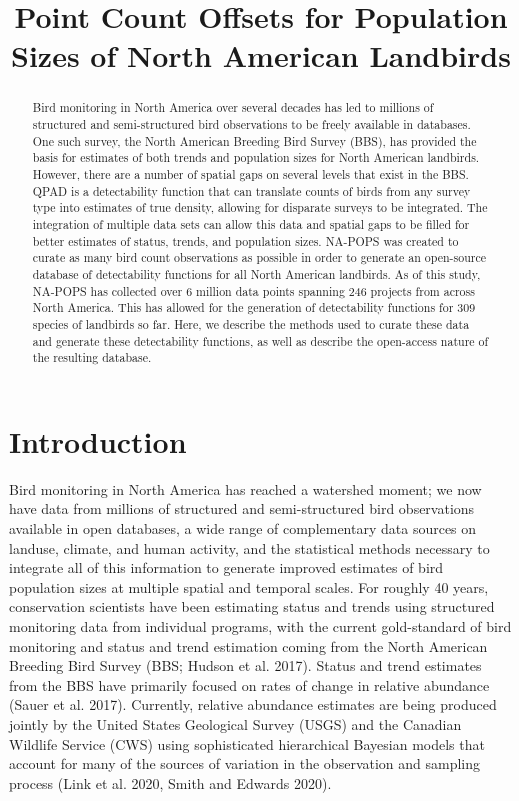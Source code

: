 \documentclass[]{article}
\title{Point Count Offsets for Population Sizes of North American Landbirds}
\author{}
\begin{document}
\maketitle

\begin{abstract}
Bird monitoring in North America over several decades has led to millions of structured and semi-structured bird observations to be freely available in databases. One such survey, the North American Breeding Bird Survey (BBS), has provided the basis for estimates of both trends and population sizes for North American landbirds. However, there are a number of spatial gaps on several levels that exist in the BBS. QPAD is a detectability function that can translate counts of birds from any survey type into estimates of true density, allowing for disparate surveys to be integrated. The integration of multiple data sets can allow this data and spatial gaps to be filled for better estimates of status, trends, and population sizes. NA-POPS was created to curate as many bird count observations as possible in order to generate an open-source database of detectability functions for all North American landbirds. As of this study, NA-POPS has collected over 6 million data points spanning 246 projects from across North America. This has allowed for the generation of detectability functions for 309 species of landbirds so far. Here, we describe the methods used to curate these data and generate these detectability functions, as well as describe the open-access nature of the resulting database.
\end{abstract}

\section{Introduction}
Bird monitoring in North America has reached a watershed moment; we now have data from millions of structured and semi-structured bird observations available in open databases, a wide range of complementary data sources on landuse, climate, and human activity, and the statistical methods necessary to integrate all of this information to generate improved estimates of bird population sizes at multiple spatial and temporal scales. For roughly 40 years, conservation scientists have been estimating status and trends using structured monitoring data from individual programs, with the current gold-standard of bird monitoring and status and trend estimation coming from the North American Breeding Bird Survey (BBS; Hudson et al. 2017). Status and trend estimates from the BBS have primarily focused on rates of change in relative abundance (Sauer et al. 2017). Currently, relative abundance estimates are being produced jointly by the United States Geological Survey (USGS) and the Canadian Wildlife Service (CWS) using sophisticated hierarchical Bayesian models that account for many of the sources of variation in the observation and sampling process (Link et al. 2020, Smith and Edwards 2020).
\end{document}
